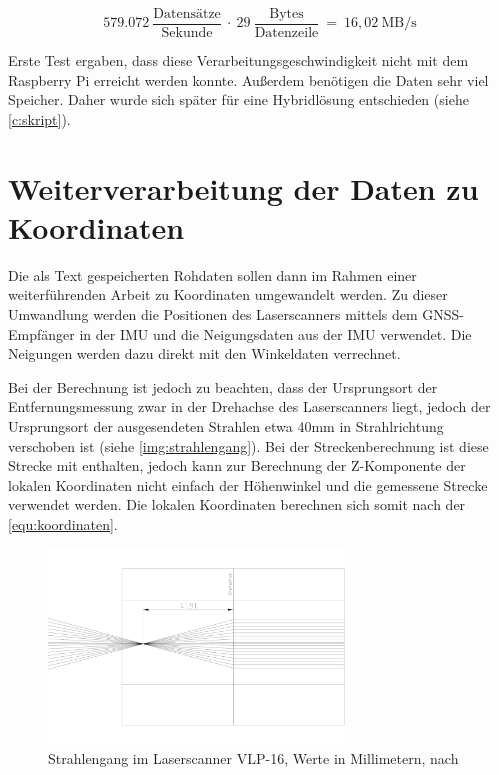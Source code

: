 \documentclass[a4paper,12pt,bibliography=totoc, listof=totoc,titlepage,pointlessnumbers]{scrreprt}
\begin{document}
\begin{equation}
579.072~\frac{\text{Datens\"{a}tze}}{\text{Sekunde}}~\cdot~29~\frac{\text{Bytes}}{\text{Datenzeile}}~=~16,02~\text{MB/s}
\label{equ:Datenrate}
\end{equation}

Erste Test ergaben, dass diese Verarbeitungsgeschwindigkeit nicht mit dem Raspberry Pi erreicht werden konnte. Außerdem benötigen die Daten sehr viel Speicher. Daher wurde sich später für eine Hybridlösung entschieden (siehe \autoref{c:skript}).

\section{Weiterverarbeitung der Daten zu Koordinaten}
Die als Text gespeicherten Rohdaten sollen dann im Rahmen einer weiterführenden Arbeit zu Koordinaten umgewandelt werden. Zu dieser Umwandlung werden die Positionen des Laserscanners mittels dem GNSS-Empfänger in der IMU und die Neigungsdaten aus der IMU verwendet. Die Neigungen werden dazu direkt mit den Winkeldaten verrechnet.

Bei der Berechnung ist jedoch zu beachten, dass der Ursprungsort der Entfernungsmessung zwar in der Drehachse des Laserscanners liegt, jedoch der Ursprungsort der ausgesendeten Strahlen etwa 40mm in Strahlrichtung verschoben ist (siehe \autoref{img:strahlengang}). Bei der Streckenberechnung ist diese Strecke mit enthalten, jedoch kann zur Berechnung der Z-Komponente der lokalen Koordinaten nicht einfach der Höhenwinkel und die gemessene Strecke verwendet werden. Die lokalen Koordinaten berechnen sich somit nach der \autoref{equ:koordinaten}.

\begin{figure}
 \centering
 \includegraphics[width=0.7\textwidth]{./img/Strahlengang.png}
 \caption{Strahlengang im Laserscanner VLP-16, Werte in Millimetern, nach 
\citet{vlpCAD}}
 \label{img:strahlengang}
\end{figure}
\end{document}
